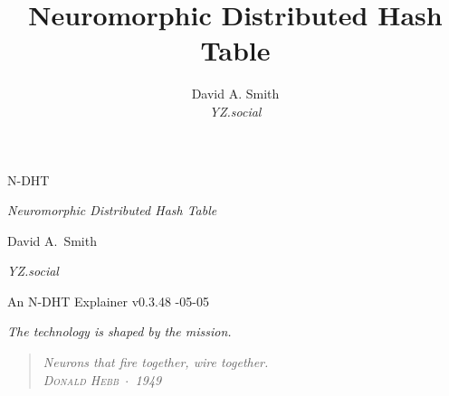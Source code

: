\documentclass[nobib]{tufte-handout}
\title{Neuromorphic Distributed Hash Table}
\author[David A. Smith]{David A. Smith \\[0.3em] \emph{\small YZ.social}}
\date{}
\begin{document}

\thispagestyle{empty}
\null\vfill
\begin{center}
{\fontsize{48}{52}\selectfont \textsc{N-DHT}\par}
\vspace{0.6em}
{\Large\itshape Neuromorphic Distributed Hash Table\par}
\vspace{4em}
{\large David A.~Smith\par}
{\itshape\small YZ.social\par}
\vspace{2em}
{\small An N-DHT Explainer \quad v0.3.48 -05-05\par}
\end{center}
\vfill
\null
\newpage

\thispagestyle{empty}
\null\vfill
\begin{flushright}
\itshape The technology is shaped by the mission.\par
\end{flushright}
\vfill
\null\newpage

\pagestyle{ndhtplain}
\thispagestyle{ndhtplain}
\setcounter{page}{1}

\begin{quote}
  \itshape Neurons that fire together, wire together.\\[0.3em]
  \normalfont\textsc{\footnotesize Donald Hebb} \,$\cdot$\, 1949
\end{quote}
\end{document}

